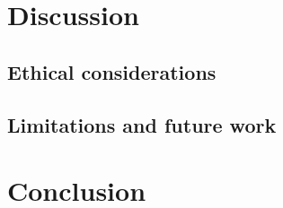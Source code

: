 \documentclass{article}
\begin{document}
\section{Discussion}

\subsection{Ethical considerations}

\subsection{Limitations and future work}


\section{Conclusion}










\end{document}
